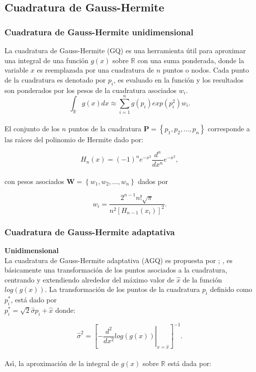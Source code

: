 \subsection{Cuadratura de Gauss-Hermite}\label{sec:Cuadratura}

\subsubsection{Cuadratura de Gauss-Hermite unidimensional}

La cuadratura de Gauss-Hermite (GQ) es una herramienta \'{u}til para aproximar una integral de una funci\'{o}n $g(x)$ sobre $\mathbb{R}$ con una suma ponderada, donde la variable $x$ es reemplazada por una cuadratura de $n$ puntos o nodos. Cada punto de la cuadratura es denotado por $p_i$, es evaluado en la funci\'{o}n y los resultados son ponderados por los pesos de la cuadratura asociados $w_i$.
\[
\int_{\mathbb{R}}{g(x)dx}\approx\sum_{i=1}^{n}{g(p_i)exp(p_i^2)w_i.}
\]
\\
El conjunto de los $n$ puntos de la cuadratura $\textbf{P}=\left\{p_1,p_2,\ldots,p_n\right\}$ corresponde a las ra\'{\i}ces del polinomio de Hermite dado por:

\[
H_n{(x)}=(-1)^ne^{-x^2}\frac{d^n}{dx^n}e^{-x^2},
\]
\\
con pesos asociados $\textbf{W}=\left\{w_1,w_2,\ldots,w_n\right\}$ dados por

\[
w_i=\frac{2^{n-1}n!\sqrt{\pi}}{n^2{[H_{n-1}(x_i)]}^2}.
\]

\subsubsection{Cuadratura de Gauss-Hermite adaptativa}

\textbf{Unidimensional\\}
La cuadratura de Gauss-Hermite adaptativa (AGQ) es propuesta por \cite{Liu1}; \citep{Pinheiro1}, es b\'{a}sicamente una transformaci\'{o}n de los puntos asociados a la cuadratura, centrando y extendiendo alrededor del m\'{a}ximo valor de $\hat{x}$ de la funci\'{o}n $log(g(x))$. La transformaci\'{o}n de los puntos de la cuadratura $p_i$ definido como $p_i^*$, est\'{a} dado por \\
$p_i^*=\sqrt{2}\hat{\sigma}p_i+\hat{x}$ donde:

\[
\hat{\sigma}^2={\left[\left. -\frac{d^2}{dx^2}log(g(x))\right|_{x=\hat{x}}\right]^{-1}}.
\]
\\
As\'{\i}, la aproximaci\'{o}n de la integral de $g(x)$ sobre $\mathbb{R}$ est\'{a} dada por:

